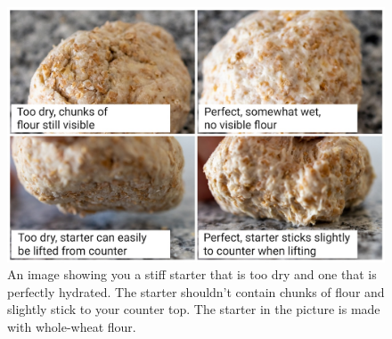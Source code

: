 \begin{figure}[!htb]
  \includegraphics[width=\textwidth]{stiff-starter-dry-check.jpg}
  \caption[Too dry and perfectly hydrated stiff starter]{An image showing you a
      stiff starter that is too dry and one that is perfectly hydrated.  The
      starter shouldn't contain chunks of flour and slightly stick to your
      counter top. The starter in the picture is made with whole-wheat flour.}%
  \label{fig:stiff-starter-dry-check}
\end{figure}

\begin{flowchart}[!htb]
\begin{center}
  
  \caption[Converting to a stiff starter]{The process to convert your regular
      starter into a stiff starter. The whole process takes around 3 days. The
      longer you maintain your starter at the suggested hydration level, the
      more adapted your microorganisms become. The stiff starter boosts the
      yeast activity of your sourdough starter.  The guide uses a
      \qty{50}{\percent} hydration level for the starter. If the dough is too
      stiff consider increasing this to \qty{60}{\percent}.}%
  \label{fig:stiff-starter-conversion}
\end{center}
\end{flowchart}

